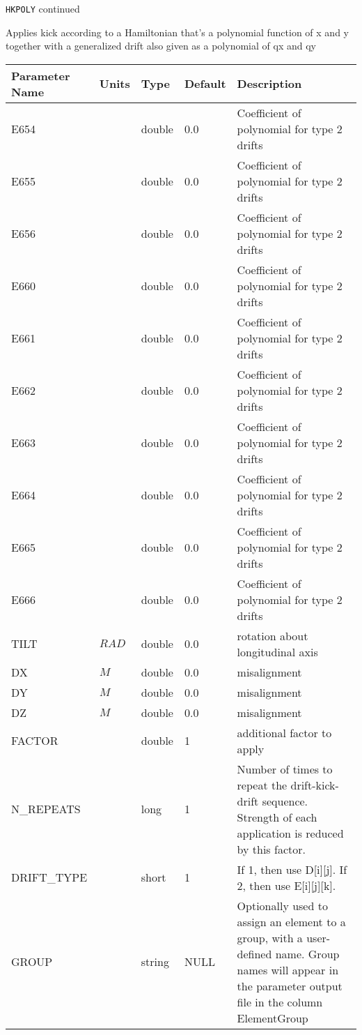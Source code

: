\newpage
\begin{center}{\Large\verb|HKPOLY| continued}\end{center}
Applies kick according to a Hamiltonian that's a polynomial function of x and y together with a generalized drift also given as a polynomial of qx and qy
\\
\begin{tabular}{|l|l|l|l|p{\descwidth}|} \hline
Parameter Name & Units & Type & Default & Description \\ \hline 
E654 &  & double &  0.0 & Coefficient of polynomial for type 2 drifts  \\ \hline 
E655 &  & double &  0.0 & Coefficient of polynomial for type 2 drifts  \\ \hline 
E656 &  & double &  0.0 & Coefficient of polynomial for type 2 drifts  \\ \hline 
E660 &  & double &  0.0 & Coefficient of polynomial for type 2 drifts  \\ \hline 
E661 &  & double &  0.0 & Coefficient of polynomial for type 2 drifts  \\ \hline 
E662 &  & double &  0.0 & Coefficient of polynomial for type 2 drifts  \\ \hline 
E663 &  & double &  0.0 & Coefficient of polynomial for type 2 drifts  \\ \hline 
E664 &  & double &  0.0 & Coefficient of polynomial for type 2 drifts  \\ \hline 
E665 &  & double &  0.0 & Coefficient of polynomial for type 2 drifts  \\ \hline 
E666 &  & double &  0.0 & Coefficient of polynomial for type 2 drifts  \\ \hline 
TILT & $RAD$ & double &  0.0 & rotation about longitudinal axis  \\ \hline 
DX & $M$ & double &  0.0 & misalignment  \\ \hline 
DY & $M$ & double &  0.0 & misalignment  \\ \hline 
DZ & $M$ & double &  0.0 & misalignment  \\ \hline 
FACTOR &  & double &   1 & additional factor to apply  \\ \hline 
N\_REPEATS &  & long &   1               & Number of times to repeat the drift-kick-drift sequence. Strength of each application is reduced by this factor.  \\ \hline 
DRIFT\_TYPE &  & short &   1               & If 1, then use D[i][j]. If 2, then use E[i][j][k].  \\ \hline 
GROUP &  & string & NULL & Optionally used to assign an element to a group, with a user-defined name.  Group names will appear in the parameter output file in the column ElementGroup  \\ \hline 
\end{tabular}

